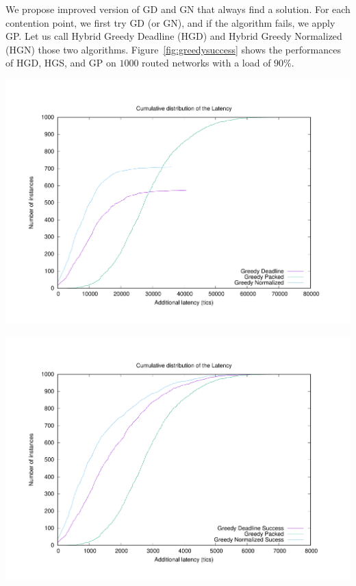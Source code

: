 \documentclass[english]{article}
\begin{document}
We propose improved version of GD and GN that always find a solution. For each contention point, we first try GD (or GN), 
and if the algorithm fails, we apply GP. Let us call Hybrid Greedy Deadline (HGD) and Hybrid Greedy Normalized (HGN) those two algorithms. Figure~\ref{fig:greedysuccess} shows the performances of HGD, HGS, and GP on $1000$ routed networks with a load of $90\%$.

 	\begin{minipage}[c]{.45\linewidth}
	\centering
	\includegraphics[scale=0.23]{90load}
\label{fig:90load}
\end{minipage}
\begin{minipage}[c]{.45\linewidth}
	\centering
	\includegraphics[scale=0.23]{greedysuccess}
\label{fig:greedysuccess}
\end{minipage}
\end{document}
